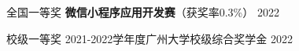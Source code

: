 

\begin{cvhonors}

    \cvhonor
    {全国一等奖} %
    {\textbf{微信小程序应用开发赛}（获奖率0.3\%）} %
    {} %
    {2022} %

    \cvhonor
    {校级一等奖} %
    {2021-2022学年度广州大学校级综合奖学金} %
    {} %
    {2022} %

\end{cvhonors}
